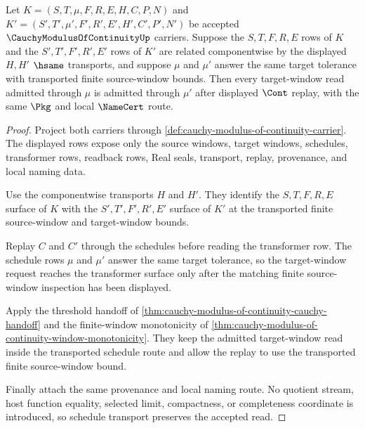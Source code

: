 \begin{theorem}
\label{thm:cauchy-modulus-of-continuity-schedule-stability}
Let $K=(S,T,\mu,F,R,E,H,C,P,N)$ and
$K'=(S',T',\mu',F',R',E',H',C',P',N')$ be accepted
$\CauchyModulusOfContinuityUp$ carriers. Suppose the $S,T,F,R,E$ rows of $K$
and the $S',T',F',R',E'$ rows of $K'$ are related componentwise by the
displayed $H,H'$ $\hsame$ transports, and suppose $\mu$ and $\mu'$ answer the
same target tolerance with transported finite source-window bounds. Then every
target-window read admitted through $\mu$ is admitted through $\mu'$ after
displayed $\Cont$ replay, with the same $\Pkg$ and local $\NameCert$ route.
\end{theorem}
\begin{proof}
Project both carriers through
\autoref{def:cauchy-modulus-of-continuity-carrier}. The displayed rows expose
only the source windows, target windows, schedules, transformer rows, readback
rows, Real seals, transport, replay, provenance, and local naming data.

Use the componentwise transports $H$ and $H'$. They identify the $S,T,F,R,E$
surface of $K$ with the $S',T',F',R',E'$ surface of $K'$ at the transported
finite source-window and target-window bounds.

Replay $C$ and $C'$ through the schedules before reading the transformer row.
The schedule rows $\mu$ and $\mu'$ answer the same target tolerance, so the
target-window request reaches the transformer surface only after the matching
finite source-window inspection has been displayed.

Apply the threshold handoff of
\autoref{thm:cauchy-modulus-of-continuity-cauchy-handoff} and the finite-window
monotonicity of \autoref{thm:cauchy-modulus-of-continuity-window-monotonicity}.
They keep the admitted target-window read inside the transported schedule route
and allow the replay to use the transported finite source-window bound.

Finally attach the same provenance and local naming route. No quotient stream,
host function equality, selected limit, compactness, or completeness coordinate
is introduced, so schedule transport preserves the accepted read.
\end{proof}

